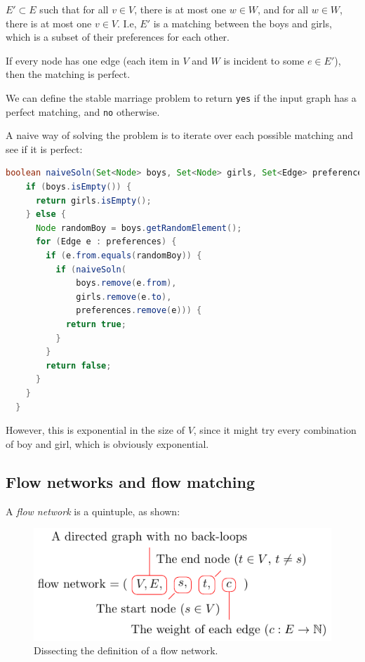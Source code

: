$E' \subset E$ such that for all $v \in V$, there is at most one $w \in W$, and
for all $w \in W$, there is at most one $v \in V$. I.e, $E'$ is a matching
between the boys and girls, which is a subset of their preferences for each
other.

If every node has one edge (each item in $V$ and $W$ is incident to some $e \in
E'$), then the matching is perfect.

We can define the stable marriage problem to return \texttt{yes} if the input
graph has a perfect matching, and \texttt{no} otherwise.

A naive way of solving the problem is to iterate over each possible matching and
see if it is perfect:

\begin{lstlisting}[language=Java]
  boolean naiveSoln(Set<Node> boys, Set<Node> girls, Set<Edge> preferences) {
    if (boys.isEmpty()) {
      return girls.isEmpty();
    } else {
      Node randomBoy = boys.getRandomElement();
      for (Edge e : preferences) {
        if (e.from.equals(randomBoy)) {
          if (naiveSoln(
              boys.remove(e.from),
              girls.remove(e.to),
              preferences.remove(e))) {
            return true;
          }
        }
        return false;
      }
    }
  }
\end{lstlisting}

However, this is exponential in the size of $V$, since it might try every
combination of boy and girl, which is obviously exponential.

\subsection{Flow networks and flow matching}

A \textit{flow network} is a quintuple, as shown:

\begin{figure}[H]
  \centering
  \includegraphics{equations/flow-network}
  \caption{Dissecting the definition of a flow network.}
  \label{fig:flow-network-definition}
\end{figure}

